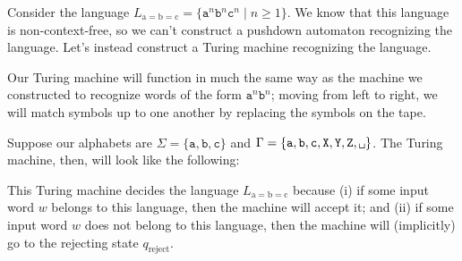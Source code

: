 \begin{example}
Consider the language $L_{\text{a}=\text{b}=\text{c}} = \{\texttt{a}^{n}\texttt{b}^{n}\texttt{c}^{n} \mid n \geq 1\}$. We know that this language is non-context-free, so we can't construct a pushdown automaton recognizing the language. Let's instead construct a Turing machine recognizing the language.

Our Turing machine will function in much the same way as the machine we constructed to recognize words of the form $\texttt{a}^{n}\texttt{b}^{n}$; moving from left to right, we will match symbols up to one another by replacing the symbols on the tape.

Suppose our alphabets are $\Sigma = \{\texttt{a}, \texttt{b}, \texttt{c}\}$ and $\Gamma = \{\texttt{a}, \texttt{b}, \texttt{c}, \texttt{X}, \texttt{Y}, \texttt{Z}, \blankspace\}$. The Turing machine, then, will look like the following:
\begin{center}
\end{center}

This Turing machine decides the language $L_{\text{a}=\text{b}=\text{c}}$ because (i) if some input word $w$ belongs to this language, then the machine will accept it; and (ii) if some input word $w$ does not belong to this language, then the machine will (implicitly) go to the rejecting state $q_{\text{reject}}$.
\end{example}

